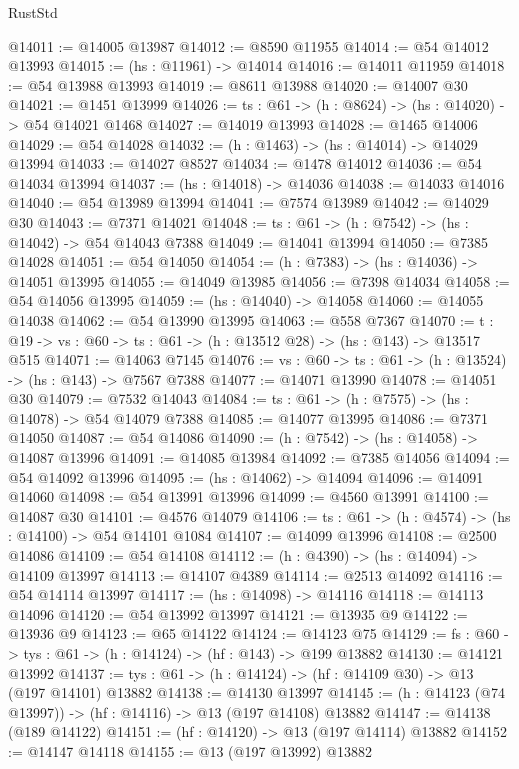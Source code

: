 \begin{lexlean}{RustStd}
\begin{coremodule}
@14011 := @14005 @13987
@14012 := @8590 @11955
@14014 := @54 @14012 @13993
@14015 := (hs : @11961) -> @14014
@14016 := @14011 @11959
@14018 := @54 @13988 @13993
@14019 := @8611 @13988
@14020 := @14007 @30
@14021 := @1451 @13999
@14026 := {ts : @61} -> (h : @8624) -> (hs : @14020) -> @54 @14021 @1468
@14027 := @14019 @13993
@14028 := @1465 @14006
@14029 := @54 @14028
@14032 := (h : @1463) -> (hs : @14014) -> @14029 @13994
@14033 := @14027 @8527
@14034 := @1478 @14012
@14036 := @54 @14034 @13994
@14037 := (hs : @14018) -> @14036
@14038 := @14033 @14016
@14040 := @54 @13989 @13994
@14041 := @7574 @13989
@14042 := @14029 @30
@14043 := @7371 @14021
@14048 := {ts : @61} -> (h : @7542) -> (hs : @14042) -> @54 @14043 @7388
@14049 := @14041 @13994
@14050 := @7385 @14028
@14051 := @54 @14050
@14054 := (h : @7383) -> (hs : @14036) -> @14051 @13995
@14055 := @14049 @13985
@14056 := @7398 @14034
@14058 := @54 @14056 @13995
@14059 := (hs : @14040) -> @14058
@14060 := @14055 @14038
@14062 := @54 @13990 @13995
@14063 := @558 @7367
@14070 := {t : @19} -> {vs : @60} -> {ts : @61} -> (h : @13512 @28) -> (hs : @143) -> @13517 @515
@14071 := @14063 @7145
@14076 := {vs : @60} -> {ts : @61} -> (h : @13524) -> (hs : @143) -> @7567 @7388
@14077 := @14071 @13990
@14078 := @14051 @30
@14079 := @7532 @14043
@14084 := {ts : @61} -> (h : @7575) -> (hs : @14078) -> @54 @14079 @7388
@14085 := @14077 @13995
@14086 := @7371 @14050
@14087 := @54 @14086
@14090 := (h : @7542) -> (hs : @14058) -> @14087 @13996
@14091 := @14085 @13984
@14092 := @7385 @14056
@14094 := @54 @14092 @13996
@14095 := (hs : @14062) -> @14094
@14096 := @14091 @14060
@14098 := @54 @13991 @13996
@14099 := @4560 @13991
@14100 := @14087 @30
@14101 := @4576 @14079
@14106 := {ts : @61} -> (h : @4574) -> (hs : @14100) -> @54 @14101 @1084
@14107 := @14099 @13996
@14108 := @2500 @14086
@14109 := @54 @14108
@14112 := (h : @4390) -> (hs : @14094) -> @14109 @13997
@14113 := @14107 @4389
@14114 := @2513 @14092
@14116 := @54 @14114 @13997
@14117 := (hs : @14098) -> @14116
@14118 := @14113 @14096
@14120 := @54 @13992 @13997
@14121 := @13935 @9
@14122 := @13936 @9
@14123 := @65 @14122
@14124 := @14123 @75
@14129 := {fs : @60} -> {tys : @61} -> (h : @14124) -> (hf : @143) -> @199 @13882
@14130 := @14121 @13992
@14137 := {tys : @61} -> (h : @14124) -> (hf : @14109 @30) -> @13 (@197 @14101) @13882
@14138 := @14130 @13997
@14145 := (h : @14123 (@74 @13997)) -> (hf : @14116) -> @13 (@197 @14108) @13882
@14147 := @14138 (@189 @14122)
@14151 := (hf : @14120) -> @13 (@197 @14114) @13882
@14152 := @14147 @14118
@14155 := @13 (@197 @13992) @13882

\end{coremodule}
\end{lexlean}
